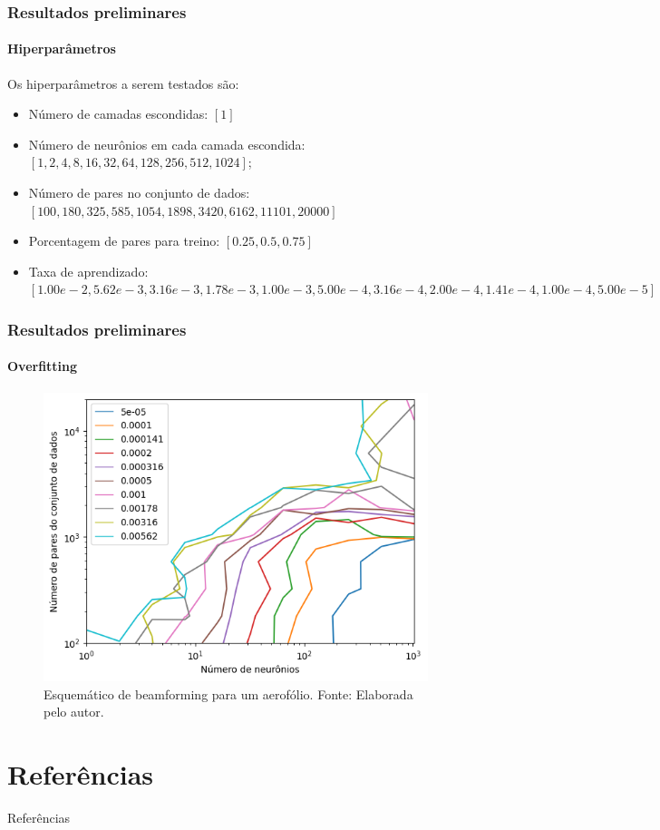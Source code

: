 \documentclass[aspectratio=169]{beamer}
\newcommand{\fautor}{Fonte: Elaborada pelo autor.}
\begin{document}
\begin{frame}
\frametitle{Resultados preliminares}
\framesubtitle{Hiperparâmetros}

Os hiperparâmetros a serem testados são:
\begin{itemize}
    \item Número de camadas escondidas: $ [1] $ 
    \item Número de neurônios em cada camada escondida: $[1, 2, 4, 8, 16, 32, 64, 128, 256, 512, 1024]$;
    \item Número de pares no conjunto de dados: $[100, 180, 325, 585, 1054, 1898, 3420, 6162, 11101, 20000]$
    \item Porcentagem de pares para treino: $[0.25, 0.5, 0.75]$
    \item Taxa de aprendizado: $[1.00e-2, 5.62e-3, 3.16e-3, 1.78e-3, 1.00e-3, 5.00e-4, 3.16e-4, 2.00e-4, 1.41e-4, 1.00e-4, 5.00e-5]$
\end{itemize}

\end{frame}

\begin{frame}
\frametitle{Resultados preliminares}
\framesubtitle{Overfitting}

\begin{figure}[H]
    \centering
    \includegraphics[width=0.6\columnwidth]{overfit.png}
    \caption{Esquemático de beamforming para um aerofólio. \fautor}
\end{figure}

\end{frame}
\section{Referências}


\begin{frame}[allowframebreaks]{Referências}

\end{frame}

\end{document}
